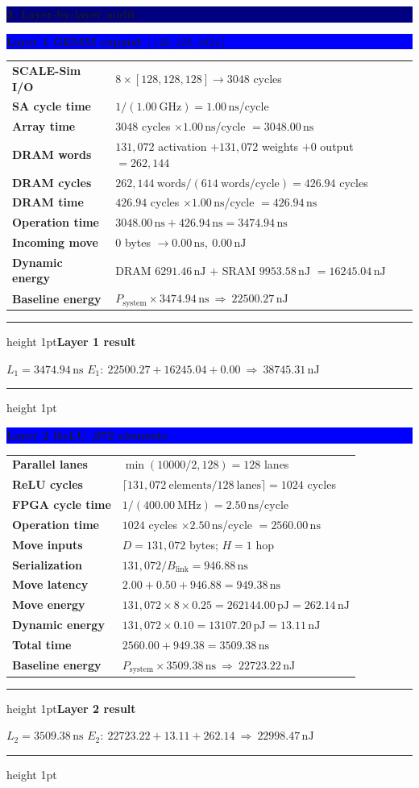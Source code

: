 \documentclass[10pt]{article}
\newcommand{\ns}{\,\mathrm{ns}}
\newcommand{\pj}{\,\mathrm{pJ}}
\newcommand{\nj}{\,\mathrm{nJ}}
\newenvironment{resultbox}[1]
  {\begin{center}\begin{minipage}{0.93\linewidth}\color{green}
   \hrule height 1pt\vspace{0.35em}\textbf{#1}\par\smallskip\color{black}}
  {\vspace{0.25em}\color{green}\hrule height 1pt\end{minipage}\end{center}}
\newcommand{\sectionbar}[1]{\vspace{0.5em}\noindent
  \colorbox{navy}{\parbox{\dimexpr\linewidth-2\fboxsep\relax}{
  \color{white}\large\bfseries #1}}\par\vspace{0.35em}}
\newcommand{\layerbar}[1]{\vspace{0.35em}\noindent
  \colorbox{blue}{\parbox{\dimexpr\linewidth-2\fboxsep\relax}{
  \color{white}\bfseries #1}}\par\vspace{0.2em}}
\begin{document}
\sectionbar{3. Layer-by-layer audit}
\layerbar{Layer 1 \quad GEMM expand \quad $[128,128,1024]$}
\begin{tabularx}{\linewidth}{@{}L Y@{}}
\textbf{SCALE-Sim I/O} & $8\times[128,128,128]\rightarrow3048$ cycles \\
\textbf{SA cycle time} & $1/(1.00\ \mathrm{GHz})=1.00\ns$/cycle \\
\textbf{Array time} & $3048$ cycles $\times1.00\ns$/cycle $=3048.00\ns$ \\
\textbf{DRAM words} & $131{,}072$ activation $+131{,}072$ weights $+0$ output $=262{,}144$ \\
\textbf{DRAM cycles} & $262{,}144\ \mathrm{words}/(614\ \mathrm{words/cycle})=426.94$ cycles \\
\textbf{DRAM time} & $426.94$ cycles $\times1.00\ns$/cycle $=426.94\ns$ \\
\textbf{Operation time} & $3048.00\ns+426.94\ns=3474.94\ns$ \\
\textbf{Incoming move} & $0$ bytes $\rightarrow0.00\ns,\ 0.00\nj$ \\
\textbf{Dynamic energy} & DRAM $6291.46\nj$ $+$ SRAM $9953.58\nj$ $=16245.04\nj$ \\
\textbf{Baseline energy} & $P_{\mathrm{system}}\times3474.94\ns\ \Longrightarrow\ 22500.27\nj$ \\
\bottomrule
\end{tabularx}
\begin{resultbox}{Layer 1 result}
$L_1=3474.94\ns$ \hfill $E_1:\ 22500.27+16245.04+0.00\ \Longrightarrow\ 38745.31\nj$
\end{resultbox}

\newpage
\layerbar{Layer 2 \quad ReLU ,072 elements}
\begin{tabularx}{\linewidth}{@{}L Y@{}}
\textbf{Parallel lanes} & $\min(10000/2,128)=128$ lanes \\
\textbf{ReLU cycles} & $\lceil131{,}072\ \mathrm{elements}/128\ \mathrm{lanes}\rceil=1024$ cycles \\
\textbf{FPGA cycle time} & $1/(400.00\ \mathrm{MHz})=2.50\ns$/cycle \\
\textbf{Operation time} & $1024$ cycles $\times2.50\ns$/cycle $=2560.00\ns$ \\
\textbf{Move inputs} & $D=131{,}072$ bytes; $H=1$ hop \\
\textbf{Serialization} & $131{,}072/B_{\mathrm{link}}=946.88\ns$ \\
\textbf{Move latency} & $2.00+0.50+946.88=949.38\ns$ \\
\textbf{Move energy} & $131{,}072\times8\times0.25=262144.00\pj=262.14\nj$ \\
\textbf{Dynamic energy} & $131{,}072\times0.10=13107.20\pj=13.11\nj$ \\
\textbf{Total time} & $2560.00+949.38=3509.38\ns$ \\
\textbf{Baseline energy} & $P_{\mathrm{system}}\times3509.38\ns\ \Longrightarrow\ 22723.22\nj$ \\
\bottomrule
\end{tabularx}
\begin{resultbox}{Layer 2 result}
$L_2=3509.38\ns$ \hfill $E_2:\ 22723.22+13.11+262.14\ \Longrightarrow\ 22998.47\nj$
\end{resultbox}
\end{document}
